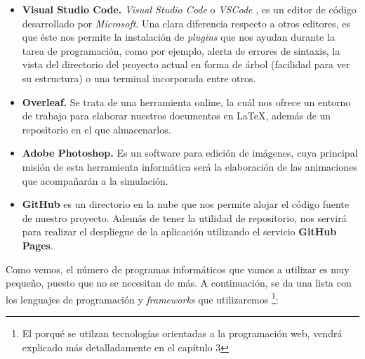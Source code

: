 \documentclass[../main.tex]{subfiles}
\begin{document}
\begin{itemize}
    \item \textbf{Visual Studio Code. } \textit{Visual Studio Code} o \textit{VSCode} \cite{vsCode}, es un editor de código desarrollado por \textit{Microsoft}. Una clara diferencia respecto a otros editores, es que éste nos permite la instalación de \textit{plugins} que nos ayudan durante la tarea de programación, como por ejemplo, alerta de errores de sintaxis, la vista del directorio del proyecto actual en forma de árbol (facilidad para ver su estructura) o una terminal incorporada entre otros.
    \item \textbf{Overleaf. }Se trata de una herramienta online, la cuál nos ofrece un entorno de trabajo para elaborar nuestros documentos en \LaTeX, además de un repositorio en el que almacenarlos.
    \item \textbf{Adobe Photoshop. }Es un software para edición de imágenes, cuya principal misión de esta herramienta informática será la elaboración de las animaciones que acompañarán a la simulación.
    \item \textbf{GitHub} es un directorio en la nube que nos permite alojar el código fuente de nuestro proyecto. Además de tener la utilidad de repositorio, nos servirá para realizar el despliegue de la aplicación utilizando el servicio \textbf{GitHub Pages}. 
\end{itemize}

Como vemos, el número de programas informáticos que vamos a utilizar es muy pequeño, puesto que no se necesitan de más. A continuación, se da una lista con los lenguajes de programación y \textit{frameworks} que utilizaremos \footnote{El porqué se utilzan tecnologías orientadas a la programación web, vendrá explicado más detalladamente en el capítulo 3}:
\end{document}
